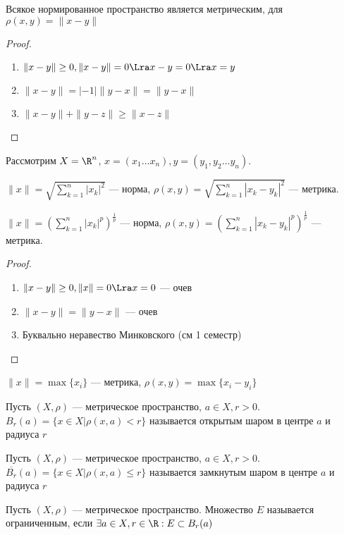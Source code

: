 \begin{lemma}
    Всякое нормированное пространство является метрическим, для \(\rho(x, y) = \|x - y\|\)
\end{lemma}
\begin{proof}\indent
    \begin{enumerate}
        \item \(\|x - y\| \ge 0, \|x - y\| = 0 \Lra x - y = 0 \Lra x = y\)
        \item \(\|x - y\| = |-1|\|y - x\| = \|y - x\|\)
        \item \(\|x - y\| + \|y - z\| \ge \|x - z\|\)
    \end{enumerate}
\end{proof}
Рассмотрим \(X = \R^n\), \(x = (x_1 \dots x_n), y = (y_1, y_2 \dots y_n)\).
\begin{example}
    \(\|x\| = \sqrt{\sum_{k = 1}^n |x_k|^2}\) --- норма, \(\rho(x, y) = \sqrt{\sum_{k = 1}^n |x_k - y_k|^2}\) --- метрика.
\end{example}
\begin{example}
    \(\|x\| = \left(\sum_{k = 1}^n |x_k|^p\right)^\frac{1}{p}\) --- норма, \(\rho(x, y) = \left(\sum_{k = 1}^n |x_k - y_k|^p\right)^\frac{1}{p}\) --- метрика.
\end{example}
\begin{proof}\indent
    \begin{enumerate}
        \item \(\|x - y\| \ge 0, \|x\| = 0 \Lra x = 0\) --- очев
        \item \(\|x - y\| = \|y - x\|\) --- очев
        \item Буквально неравество Минковского (см 1 семестр)
    \end{enumerate}
\end{proof}
\begin{example}
    \(\|x\| = \max\{x_i\}\) --- метрика, \(\rho(x, y) = \max\{x_i - y_i\}\)
\end{example}

\begin{definition}
    Пусть \((X, \rho)\) --- метрическое пространство, \(a \in X, r > 0\). \(B_r(a) = \{x \in X | \rho(x, a) < r\}\) называется открытым шаром в центре \(a\) и радиуса \(r\)
\end{definition}
\begin{definition}
    Пусть \((X, \rho)\) --- метрическое пространство, \(a \in X, r > 0\). \(\overline{B_r}(a) = \{x \in X | \rho(x, a) \le r\}\) называется замкнутым шаром в центре \(a\) и радиуса \(r\)
\end{definition}

\begin{definition}
    Пусть \((X, \rho)\) --- метрическое пространство. Множество \(E\) называется ограниченным, если \(\exists a \in X, r \in \R: E \subset B_r(a)\)
\end{definition}